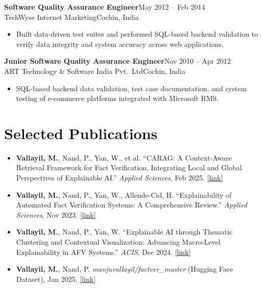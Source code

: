 \documentclass[10.5pt,a4paper]{article}
\newenvironment{expbox}{%
  \begin{tcolorbox}[
    blanker, breakable,
    left=10pt,
    borderline west={2.5pt}{0pt}{accentlt},
    before upper={\parskip=2pt},
    top=0pt, bottom=0pt
  ]
}{%
  \end{tcolorbox}\vspace{4pt}
}
\newcommand{\role}[4]{%
  {\bfseries #1}\hfill{\small\color{accent}#2}\\[-1pt]
  {\small\color{mid}#3}\hfill{\small\color{light}#4}\\[3pt]%
}
\begin{document}
\begin{expbox}
\role{Software Quality Assurance Engineer}
     {May 2012 – Feb 2014}
     {TechWyse Internet Marketing}
     {Cochin, India}
\begin{itemize}
  \item Built data-driven test suites and performed SQL-based backend validation to verify
        data integrity and system accuracy across web applications.
\end{itemize}
\end{expbox}

\begin{expbox}
\role{Junior Software Quality Assurance Engineer}
     {Nov 2010 – Apr 2012}
     {ART Technology \& Software India Pvt.\ Ltd}
     {Cochin, India}
\begin{itemize}
  \item SQL-based backend data validation, test case documentation, and system testing of
        e-commerce platforms integrated with Microsoft RMS.
\end{itemize}
\end{expbox}

\section{Selected Publications}

\begin{itemize}

  \item \textbf{Vallayil, M.}, Nand, P., Yan, W., et al.
        ``CARAG: A Context-Aware Retrieval Framework for Fact Verification, Integrating
        Local and Global Perspectives of Explainable AI.''
        \textit{Applied Sciences}, Feb 2025.
        \href{https://www.mdpi.com/2076-3417/15/4/1970}{\small[link]}

  \item \textbf{Vallayil, M.}, Nand, P., Yan, W., Allende-Cid, H.
        ``Explainability of Automated Fact Verification Systems: A Comprehensive Review.''
        \textit{Applied Sciences}, Nov 2023.
        \href{https://www.mdpi.com/2076-3417/13/23/12608}{\small[link]}

  \item \textbf{Vallayil, M.}, Nand, P., Yan, W.
        ``Explainable AI through Thematic Clustering and Contextual Visualization:
        Advancing Macro-Level Explainability in AFV Systems.''
        \textit{ACIS}, Dec 2024.
        \href{https://aisel.aisnet.org/acis2024/101/}{\small[link]}

  \item \textbf{Vallayil, M.}, Nand, P.
        \textit{manjuvallayil/factver\_master} (Hugging Face Dataset), Jan 2025.
        \href{https://doi.org/10.57967/hf/5772}{\small[link]}

\end{itemize}
\end{document}
